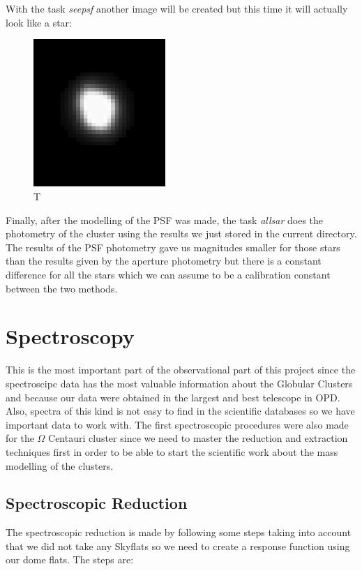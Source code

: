 With the task \textit{seepsf} another image will be created but this time it will actually look like a star:

\begin{figure}[h]
\centering
\includegraphics[width=5cm]{images/psf3.png}
\caption{T}
\end{figure}

Finally, after the modelling of the PSF was made, the task \textit{allsar} does the photometry of the cluster using the results we just stored in the current directory. The results of the PSF photometry gave us magnitudes smaller for those stars than the results given by the aperture photometry but there is a constant difference for all the stars which we can assume to be a calibration constant between the two methods. 

\section{Spectroscopy}

This is the most important part of the observational part of this project since the spectroscipc data has the most valuable information about the Globular Clusters and because our data were obtained in the largest and best telescope in OPD. Also, spectra of this kind is not easy to find in the scientific databases so we have important data to work with. The first spectroscopic procedures were also made for the $ \Omega $ Centauri cluster since we need to master the reduction and extraction techniques first in order to be able to start the scientific work about the mass modelling of the clusters.

\subsection{Spectroscopic Reduction}

The spectroscopic reduction is made by following some steps taking into account that we did not take any Skyflats so we need to create a response function using our dome flats. The steps are:

